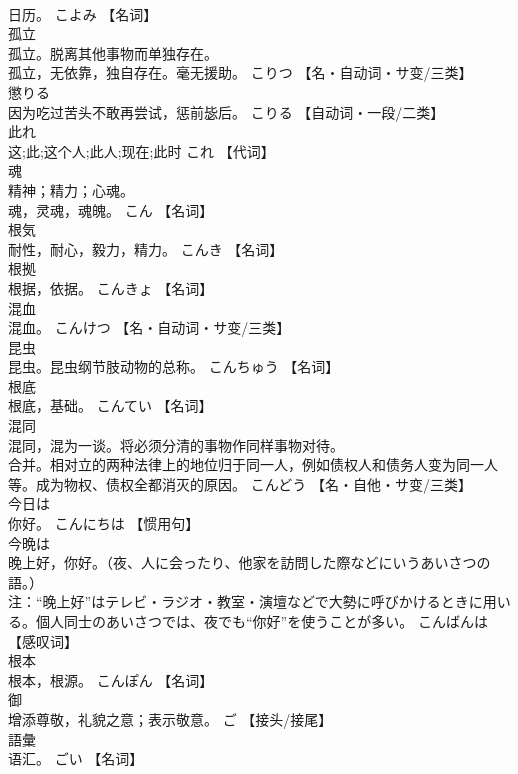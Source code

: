 \documentclass[8pt]{extreport}
\begin{document}
\begin{CJK}{UTF8}{min}
\\	日历。	こよみ		【名词】
\\	孤立	
\\	孤立。脱离其他事物而单独存在。 
\\	孤立，无依靠，独自存在。毫无援助。	こりつ		【名・自动词・サ变/三类】
\\	懲りる	
\\	因为吃过苦头不敢再尝试，惩前毖后。	こりる		【自动词・一段/二类】
\\	此れ	
\\	这;此;这个人;此人;现在;此时	これ		【代词】
\\	魂	
\\	精神；精力；心魂。 
\\	魂，灵魂，魂魄。	こん		【名词】
\\	根気	
\\	耐性，耐心，毅力，精力。	こんき		【名词】
\\	根拠	
\\	根据，依据。	こんきょ		【名词】
\\	混血	
\\	混血。	こんけつ		【名・自动词・サ变/三类】
\\	昆虫	
\\	昆虫。昆虫纲节肢动物的总称。	こんちゅう		【名词】
\\	根底	
\\	根底，基础。	こんてい		【名词】
\\	混同	
\\	混同，混为一谈。将必须分清的事物作同样事物对待。 
\\	合并。相对立的两种法律上的地位归于同一人，例如债权人和债务人变为同一人等。成为物权、债权全都消灭的原因。	こんどう		【名・自他・サ变/三类】
\\	今日は	
\\	你好。	こんにちは		【惯用句】
\\	今晩は	
\\	晚上好，你好。（夜、人に会ったり、他家を訪問した際などにいうあいさつの語。） 
\\	注：“晚上好”はテレビ・ラジオ・教室・演壇などで大勢に呼びかけるときに用いる。個人同士のあいさつでは、夜でも“你好”を使うことが多い。	こんばんは		【感叹词】
\\	根本	
\\	根本，根源。	こんぽん		【名词】
\\	御	
\\	增添尊敬，礼貌之意；表示敬意。	ご		【接头/接尾】
\\	語彙	
\\	语汇。	ごい		【名词】

\end{CJK}
\end{document}
